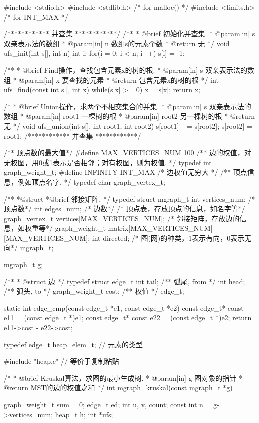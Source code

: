 \begin{Codex}[label=mgraph_kruskal.c]
#include <stdio.h>
#include <stdlib.h>  /* for malloc() */
#include <limits.h>  /* for INT_MAX */

/************ 并查集 ************/
/**
  * @brief 初始化并查集.
  * @param[in] s 双亲表示法的数组
  * @param[in] n 数组s的元素个数
  * @return 无
  */
void ufs_init(int s[], int n) {
    int i;
    for(i = 0; i < n; i++) s[i] = -1;
}

/**
  * @brief Find操作，查找包含元素x的树的根.
  * @param[in] s 双亲表示法的数组
  * @param[in] x 要查找的元素
  * @return 包含元素x的树的根
  */
int ufs_find(const int s[], int x) {
    while(s[x] >= 0) {
        x = s[x];
    }
    return x;
}

 /*
  * @brief Union操作，求两个不相交集合的并集.
  * @param[in] s 双亲表示法的数组
  * @param[in] root1 一棵树的根
  * @param[in] root2 另一棵树的根
  * @return 无
  */
void ufs_union(int s[], int root1, int root2) {
    s[root1] += s[root2];
    s[root2] = root1;
}
/************ 并查集 ************/


/** 顶点数的最大值*/
#define MAX_VERTICES_NUM 100
/** 边的权值，对无权图，用0或1表示是否相邻；对有权图，则为权值. */
typedef int graph_weight_t;
#define INFINITY INT_MAX  /* 边权值无穷大 */
/** 顶点信息，例如顶点名字. */
typedef char graph_vertex_t;

/**
 *@struct
 *@brief 邻接矩阵.
 */
typedef struct mgraph_t {
    int vertices_num; /* 顶点数*/
    int edges_num; /* 边数*/
    /* 顶点表，存放顶点的信息，如名字等*/
    graph_vertex_t vertices[MAX_VERTICES_NUM];
    /* 邻接矩阵，存放边的信息，如权重等*/
    graph_weight_t matrix[MAX_VERTICES_NUM][MAX_VERTICES_NUM];
    int directed; /* 图(网)的种类，1表示有向，0表示无向*/
} mgraph_t;

mgraph_t g;


/**
 * @struct 边
 */
typedef struct edge_t{
    int tail;  /** 弧尾, from */
    int head;  /** 弧头, to */
    graph_weight_t cost;  /** 权值 */
}edge_t;

static int edge_cmp(const edge_t *e1, const edge_t *e2) {
    const edge_t* const e11 = (const edge_t *)e1;
    const edge_t* const e22 = (const edge_t *)e2;
    return e11->cost - e22->cost;
}

typedef edge_t heap_elem_t; // 元素的类型

#include "heap.c"  // 等价于复制粘贴


/*
  * @brief Kruskal算法，求图的最小生成树.
  * @param[in] g 图对象的指针
  * @return MST的边的权值之和
  */
int mgraph_kruskal(const mgraph_t *g) {
    graph_weight_t sum = 0;
    edge_t ed;
    int u, v, count;
    const int n = g->vertices_num;
    heap_t h;
    int *ufs;

}
\end{Codex}
